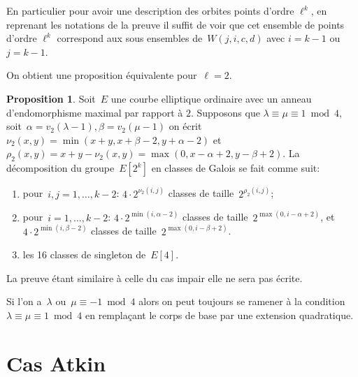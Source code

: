 \documentclass[10pt,a4paper]{book}
\theoremstyle{plain}
\theoremstyle{definition}
\theoremstyle{definition}
\theoremstyle{definition}
\newtheorem{prop}[thm]{Proposition}
\theoremstyle{definition}
\theoremstyle{remark}
\theoremstyle{remark}
\theoremstyle{definition}
\begin{document}
En particulier pour avoir une description des orbites points d'ordre $\ell^k$, en reprenant les notations de la preuve il suffit de voir que cet ensemble de points d'ordre $\ell^k$ correspond aux sous ensembles de~$W(j,i,c,d)$ avec $i=k-1$ ou $j=k-1$. 

On obtient une proposition équivalente pour~$\ell = 2$.


\begin{prop}\label{prop:orbites-2-torsion}
Soit~$E$ une courbe elliptique ordinaire avec un anneau d'endomorphisme maximal
 par rapport à $2$.
Supposons que $\lambda \equiv \mu \equiv 1 \bmod4 $, soit~$\alpha = v_2(\lambda-1), \beta=v_2(\mu-1)$
on écrit~$\nu_2(x, y) = \min (x+y, x+\beta-2, y+\alpha-2)$
et~$\rho_2(x, y) = x+y - \nu_2(x, y) = \max (0, x-\alpha+2, y-\beta+2)$.
La décomposition du groupe~$E[2^k]$ en classes de Galois se fait comme suit:
\begin{enumerate}
\item pour~$i, j = 1, …, k-2$:
$4 \cdot 2^{\nu_2(i,j)}$ classes de taille~$2^{\rho_2(i,j)}$;
\item pour~$i = 1, …, k-2$:
$4 \cdot 2^{\min (i, \alpha-2)}$ classes de taille~$2^{\max (0, i-\alpha+2)}$, et
$4 \cdot 2^{\min (i, \beta-2)}$ classes de taille~$2^{\max (0, i-\beta+2)}$.
\item les 16 classes de singleton de~$E[4]$.
\end{enumerate}
\end{prop}
La preuve étant similaire à celle du cas impair elle ne sera pas écrite.

Si l'on a~$\lambda$ ou~$\mu \equiv -1 \bmod 4$ alors
on peut toujours se ramener à la condition $\lambda \equiv \mu \equiv 1 \bmod 4$
en remplaçant le corps de base par une extension quadratique.



\section{Cas Atkin}

\end{document}
